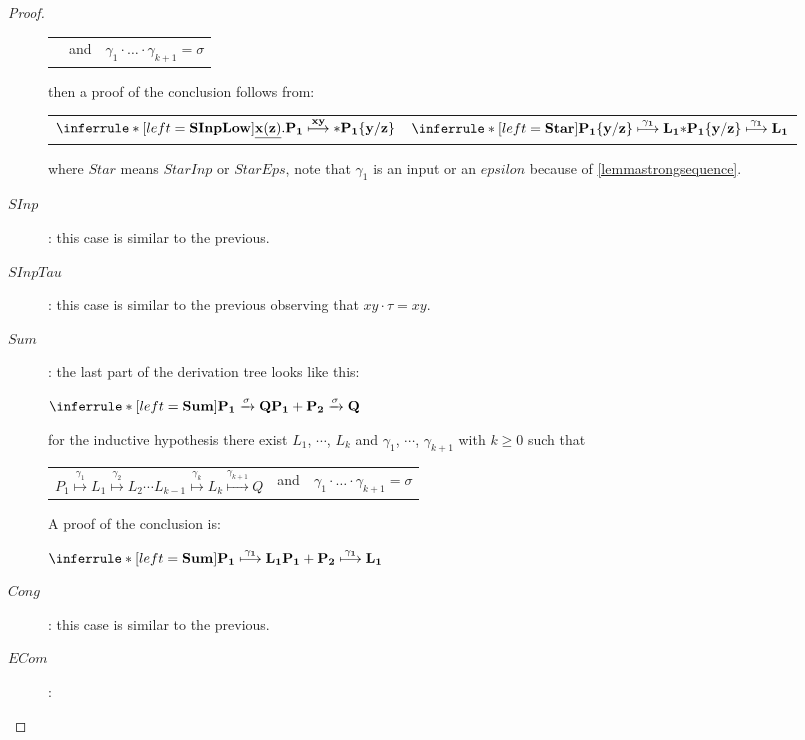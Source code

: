 \begin{proposition}
\begin{proof}
\begin{description}
\begin{center}
\begin{tabular}{lll}
	      &
		and
	      &
		$\gamma_{1} \cdot \ldots \cdot \gamma_{k+1} = \sigma$
	      \end{tabular}
	    \end{center}
	    then a proof of the conclusion follows from:
	    \begin{center}
	      \begin{tabular}{ll}
		$\inferrule* [left=\bf{SInpLow}]{
 		}{
 		  \underline{x(z)}.P_{1} \stackrel{xy}{\longmapsto} *P_{1}\{y/z\}
 		}$
	      &
		$\inferrule* [left=\bf{Star}]{
 		  P_{1}\{y/z\} \stackrel{\gamma_{1}}{\longmapsto} L_{1}
 		}{
 		  *P_{1}\{y/z\} \stackrel{\gamma_{1}}{\longmapsto} L_{1}
 		}$
	      \end{tabular}
	    \end{center}
	    where $Star$ means $StarInp$ or $StarEps$, note that $\gamma_{1}$ is an input or an $epsilon$ because of \ref{lemmastrongsequence}.
	  \item[$SInp$]: this case is similar to the previous.
	  \item[$SInpTau$]: this case is similar to the previous observing that $xy \cdot \tau = xy$.
	  \item[$Sum$]: 
	the last part of the derivation tree looks like this:
	\begin{center}
	  $\inferrule* [left=\bf{Sum}]{
	    P_{1} \xrightarrow{\sigma} Q
	  }{
	    P_{1}+P_{2} \xrightarrow{\sigma} Q
	  }$
	\end{center}
	for the inductive hypothesis there exist $L_{1}$, $\cdots$, $L_{k}$ and $\gamma_{1}$, $\cdots$, $\gamma_{k+1}$ with $k\geq 0$ such that 
	\begin{center}
	  \begin{tabular}{lll}
	    $P_{1} \stackrel{\gamma_{1}}{\longmapsto} L_{1}  \stackrel{\gamma_{2}}{\longmapsto} L_{2} \cdots L_{k-1} \stackrel{\gamma_{k}}{\longmapsto} L_{k} \stackrel{\gamma_{k+1}}{\longmapsto} Q$ 
	  &
	    and
	  &
	    $\gamma_{1} \cdot \ldots \cdot \gamma_{k+1} = \sigma$  
	  \end{tabular}
	\end{center}
	A proof of the conclusion is:
	\begin{center}
	  $\inferrule* [left=\bf{Sum}]{
	      P_{1} \stackrel{\gamma_{1}}{\longmapsto} L_{1}
	    }{
	      P_{1}+P_{2} \stackrel{\gamma_{1}}{\longmapsto} L_{1}
	    }
	  $
	\end{center}
      \item[$Cong$]: this case is similar to the previous.
      \item[$ECom$]: 

\end{description}
\end{proof}
\end{proposition}
